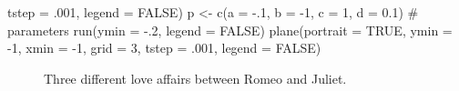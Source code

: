 \documentclass[
  a4paper,
  DIV=11,
  numbers=noendperiod,
  oneside]{scrreprt}
\newenvironment{Shaded}{}{}
\newcommand{\AttributeTok}[1]{\textcolor[rgb]{0.84,0.23,0.29}{#1}}
\newcommand{\CommentTok}[1]{\textcolor[rgb]{0.42,0.45,0.49}{#1}}
\newcommand{\ConstantTok}[1]{\textcolor[rgb]{0.00,0.36,0.77}{#1}}
\newcommand{\DecValTok}[1]{\textcolor[rgb]{0.00,0.36,0.77}{#1}}
\newcommand{\FloatTok}[1]{\textcolor[rgb]{0.00,0.36,0.77}{#1}}
\newcommand{\FunctionTok}[1]{\textcolor[rgb]{0.44,0.26,0.76}{#1}}
\newcommand{\NormalTok}[1]{\textcolor[rgb]{0.14,0.16,0.18}{#1}}
\newcommand{\OtherTok}[1]{\textcolor[rgb]{0.44,0.26,0.76}{#1}}
\newcommand{\SpecialCharTok}[1]{\textcolor[rgb]{0.00,0.36,0.77}{#1}}
\begin{document}
\begin{Shaded}
\begin{Highlighting}[]
      \AttributeTok{tstep =}\NormalTok{ .}\DecValTok{001}\NormalTok{, }\AttributeTok{legend =} \ConstantTok{FALSE}\NormalTok{)}
\NormalTok{p }\OtherTok{\textless{}{-}} \FunctionTok{c}\NormalTok{(}\AttributeTok{a =} \SpecialCharTok{{-}}\NormalTok{.}\DecValTok{1}\NormalTok{, }\AttributeTok{b =} \SpecialCharTok{{-}}\DecValTok{1}\NormalTok{, }\AttributeTok{c =} \DecValTok{1}\NormalTok{, }\AttributeTok{d =} \FloatTok{0.1}\NormalTok{) }\CommentTok{\# parameters}
\FunctionTok{run}\NormalTok{(}\AttributeTok{ymin =} \SpecialCharTok{{-}}\NormalTok{.}\DecValTok{2}\NormalTok{, }\AttributeTok{legend =} \ConstantTok{FALSE}\NormalTok{)}
\FunctionTok{plane}\NormalTok{(}\AttributeTok{portrait =} \ConstantTok{TRUE}\NormalTok{, }\AttributeTok{ymin =} \SpecialCharTok{{-}}\DecValTok{1}\NormalTok{, }\AttributeTok{xmin =} \SpecialCharTok{{-}}\DecValTok{1}\NormalTok{, }\AttributeTok{grid =} \DecValTok{3}\NormalTok{,}
      \AttributeTok{tstep =}\NormalTok{ .}\DecValTok{001}\NormalTok{, }\AttributeTok{legend =} \ConstantTok{FALSE}\NormalTok{)}
\end{Highlighting}
\end{Shaded}

\begin{figure}


\caption{\label{fig-ch4n-img9-old-57}Three different love affairs
between Romeo and Juliet.}

\end{figure}%
\end{document}
